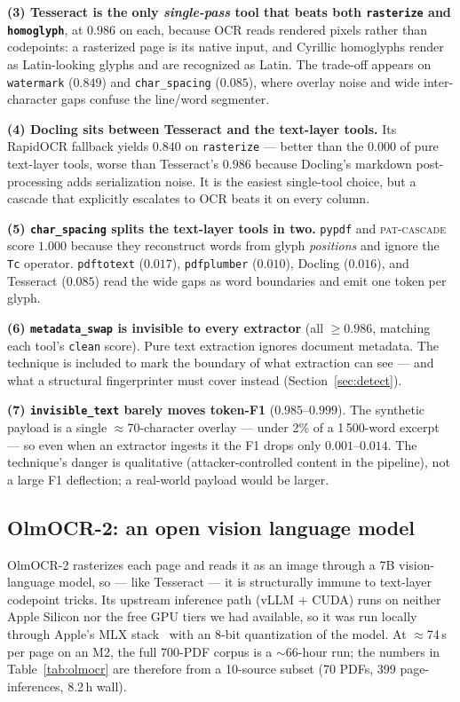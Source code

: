 \documentclass[11pt]{article}
\newcommand{\variant}[1]{\texttt{#1}}
\begin{document}
\textbf{(3) Tesseract is the only \emph{single-pass} tool that beats
both \variant{rasterize} and \variant{homoglyph}}, at $0.986$ on each,
because OCR reads rendered pixels rather than codepoints: a rasterized
page is its native input, and Cyrillic homoglyphs render as Latin-looking
glyphs and are recognized as Latin. The trade-off appears on
\variant{watermark} ($0.849$) and \variant{char\_spacing} ($0.085$),
where overlay noise and wide inter-character gaps confuse the
line/word segmenter.

\textbf{(4) Docling sits between Tesseract and the text-layer tools.}
Its RapidOCR fallback yields $0.840$ on \variant{rasterize} --- better
than the $0.000$ of pure text-layer tools, worse than Tesseract's
$0.986$ because Docling's markdown post-processing adds serialization
noise. It is the easiest single-tool choice, but a cascade that
explicitly escalates to OCR beats it on every column.

\textbf{(5) \variant{char\_spacing} splits the text-layer tools in
two.} \texttt{pypdf} and \textsc{pat-cascade} score $1.000$ because they
reconstruct words from glyph \emph{positions} and ignore the \texttt{Tc}
operator. \texttt{pdftotext} ($0.017$), \texttt{pdfplumber} ($0.010$),
Docling ($0.016$), and Tesseract ($0.085$) read the wide gaps as word
boundaries and emit one token per glyph.

\textbf{(6) \variant{metadata\_swap} is invisible to every extractor}
(all $\geq 0.986$, matching each tool's \variant{clean} score). Pure
text extraction ignores document metadata. The technique is included to
mark the boundary of what extraction can see --- and what a structural
fingerprinter must cover instead (Section~\ref{sec:detect}).

\textbf{(7) \variant{invisible\_text} barely moves token-F1}
($0.985$--$0.999$). The synthetic payload is a single
$\approx$70-character overlay --- under 2\% of a 1\,500-word excerpt ---
so even when an extractor ingests it the F1 drops only $0.001$--$0.014$.
The technique's danger is qualitative (attacker-controlled content in
the pipeline), not a large F1 deflection; a real-world payload would be
larger.

\subsection{OlmOCR-2: an open vision language model}
\label{sec:olmocr}

OlmOCR-2 rasterizes each page and reads it as an image through a 7B
vision-language model, so --- like Tesseract --- it is structurally
immune to text-layer codepoint tricks. Its upstream inference path
(vLLM + CUDA) runs on neither Apple Silicon nor the free GPU tiers we
had available, so it was run locally through Apple's MLX
stack~\cite{mlx,mlxvlm} with an 8-bit quantization of the model. At
$\approx$74\,s per page on an M2, the full 700-PDF corpus is a
$\sim$66-hour run; the numbers in Table~\ref{tab:olmocr} are therefore
from a 10-source subset (70 PDFs, 399 page-inferences, 8.2\,h wall).
\end{document}
